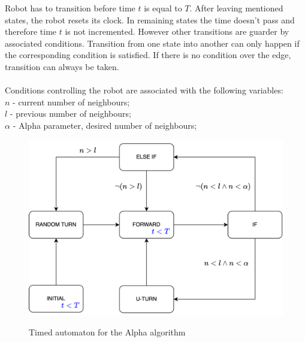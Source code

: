 Robot has to transition before time $t$ is equal to $T$. After leaving mentioned states, the robot resets its clock. In remaining states the time doesn't pass and therefore time $t$ is not incremented. However other transitions are guarder by associated conditions. Transition from one state into another can only happen if the corresponding condition is satisfied. If there is no condition over the edge, transition can always be taken.\\\\ Conditions controlling the robot are associated with the following variables:\\
$n$ - current number of neighbours;\\
$l$ - previous number of neighbours;\\
$\alpha$ - Alpha parameter, desired number of neighbours;\\
\begin{figure}[H]
\caption{Timed automaton for the Alpha algorithm}
\includegraphics[scale=0.9]{images/automaton.png}
\label{fig:automaton}
\end{figure}